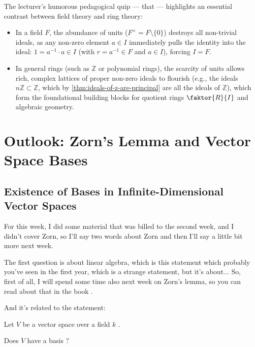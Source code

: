 \begin{insight}
The lecturer's humorous pedagogical quip --- that  --- highlights an essential contrast between field theory and ring theory:
\begin{itemize}
    \item In a field $F$, the abundance of units ($F^\times = F \setminus \{0\}$) destroys all non-trivial ideals, as any non-zero element $a \in I$ immediately pulls the identity into the ideal: $1 = a^{-1} \cdot a \in I$ (with $r = a^{-1} \in F$ and $a \in I$), forcing $I = F$.
    \item In general rings (such as $\mathbb{Z}$ or polynomial rings), the scarcity of units allows rich, complex lattices of proper non-zero ideals to flourish (e.g., the ideals $n\mathbb{Z} \subset \mathbb{Z}$, which by \cref{thm:ideals-of-z-are-principal} are all the ideals of $\mathbb{Z}$), which form the foundational building blocks for quotient rings $\faktor{R}{I}$ and algebraic geometry.
\end{itemize}
\end{insight}

\section{Outlook: Zorn's Lemma and Vector Space Bases}
\subsection{Existence of Bases in Infinite-Dimensional Vector Spaces}

\begin{speech}[00:42:20 - 00:43:29]
For this week, I did some material that was billed to the second week, and I didn't cover Zorn, so I'll say two words about Zorn and then I'll say a little bit more next week.

The first question is about linear algebra, which is this statement which  probably you've seen in the first year, which is a strange statement, but it's about... So, first of all, I will spend some time also next week on Zorn's lemma, so you can read about that in the book .

And it's related to the statement:

Let $V$ be a vector space over a field $k$ .

Does $V$ have a basis ?
\end{speech}

